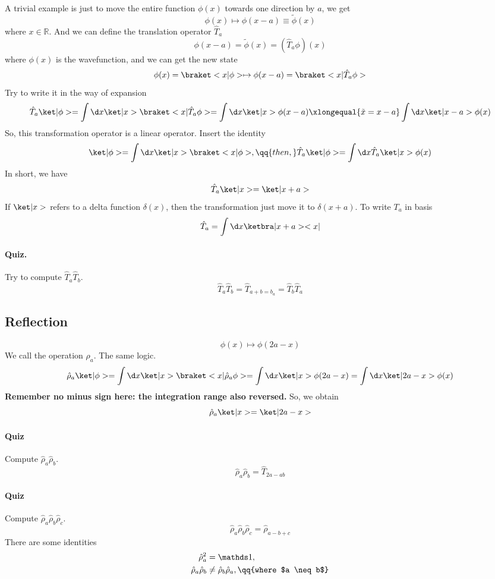 A trivial example is just to move the entire function $\phi(x)$ towards one
direction by $a$, we get
\[
  \phi(x) \mapsto \phi(x - a) \equiv \tilde \phi(x)
\]
where $x \in \mathbb R$. And we can define the translation operator $\hat T_a$
\[
  \phi(x - a) = \tilde \phi(x) = (\hat T_a\phi)(x)
\]
where $\phi(x)$ is the wavefunction, and we can get the new state
\[
  \phi(x) = \braket<x|\phi> \mapsto \phi(x - a) = \braket<x|\hat T_a\phi>
\]
Try to write it in the way of expansion
\[
  \hat T_a\ket|\phi> = \int \d x \ket|x> \braket<x|\hat T_a\phi>
= \int \d x \ket|x> \phi(x - a)
\xlongequal{\tilde x = x - a} \int \d x \ket|x - a> \phi(x)
\]
So, this transformation operator is a linear operator.
Insert the identity
\[
  \ket|\phi> = \int \d x \ket|x> \braket<x|\phi>, \qq{then,}
  \hat T_a\ket|\phi> = \int \d x \hat T_a \ket|x> \phi(x)
\]
In short, we have
\[
  \hat T_a\ket|x> = \ket|x + a>
\]
If $\ket|x>$ refers to a delta function $\delta(x)$, then the transformation
just move it to $\delta(x + a)$.
To write $T_a$ in basis
\[
  \hat T_a = \int \d x \ketbra|x + a><x|
\]
\paragraph{Quiz.}
Try to compute $\hat T_a \hat T_b$.
\[
  \hat T_a \hat T_b = \hat T_{a+b=b_a} = \hat T_b \hat T_a
\]

\subsection{Reflection}

\[
  \phi(x) \mapsto \phi(2a - x)
\]
We call the operation $\rho_a$.
The same logic.
\[
  \hat\rho_a\ket|\phi> = \int \d x \ket|x> \braket<x|\hat\rho_a\phi>
= \int \d x \ket|x> \phi(2a - x) = \int \d x \ket|2a - x> \phi(x)
\]
\textbf{Remember no minus sign here: the integration range also reversed.}
So, we obtain
\[
  \hat \rho_a\ket|x> = \ket|2a - x>
\]
\paragraph{Quiz}
Compute $\hat \rho_a \hat \rho_b$.
\[
  \hat\rho_a \hat\rho_b = \hat T_{2a - ab}
\]

\paragraph{Quiz}
Compute $\hat \rho_a \hat \rho_b \hat \rho_c$.
\[
  \hat\rho_a \hat\rho_b \hat\rho_c = \hat \rho_{a-b+c}
\]
There are some identities
\begin{align}
  \hat\rho_a^2 & = \identity,\\
  \hat\rho_a \hat\rho_b & \neq \hat\rho_b \hat\rho_a, \qq{where $a \neq b$}
\end{align}

